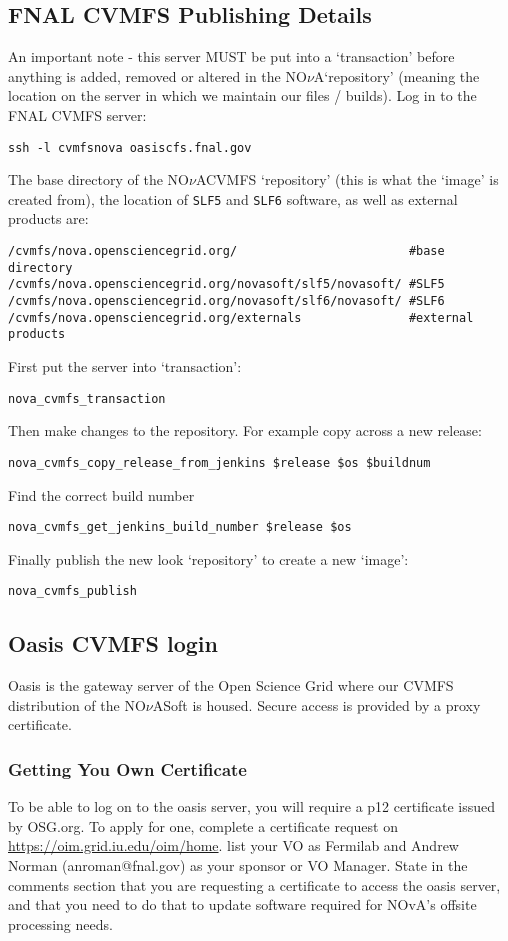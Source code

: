 \documentclass[letterpaper,10pt]{article}
\newcommand{\nova}{NO$\nu$A}
\newcommand{\novas}{\nova \space}
\begin{document}
\subsection{FNAL CVMFS Publishing Details}
An important note - this server MUST be put into a `transaction' before anything is added, removed or altered in the \novas `repository' (meaning the location on the server in which we maintain our files / builds).
\noindent
Log in to the FNAL CVMFS server:

\begin{verbatim}
ssh -l cvmfsnova oasiscfs.fnal.gov
\end{verbatim}
\noindent
The base directory of the \novas CVMFS `repository' (this is what the `image' is created from), the location of \verb|SLF5| and \verb|SLF6| software, as well as external products are:

\begin{verbatim}
/cvmfs/nova.opensciencegrid.org/                        #base directory 
/cvmfs/nova.opensciencegrid.org/novasoft/slf5/novasoft/ #SLF5
/cvmfs/nova.opensciencegrid.org/novasoft/slf6/novasoft/ #SLF6
/cvmfs/nova.opensciencegrid.org/externals               #external products
\end{verbatim}
\noindent
First put the server into `transaction':
\begin{verbatim}
nova_cvmfs_transaction
\end{verbatim}
\noindent
Then make changes to the repository. For example copy across a new release:
\begin{verbatim}
nova_cvmfs_copy_release_from_jenkins $release $os $buildnum
\end{verbatim}
\noindent
Find the correct build number
\begin{verbatim}
nova_cvmfs_get_jenkins_build_number $release $os
\end{verbatim}
\noindent
Finally publish the new look `repository' to create a new `image':
\begin{verbatim}
nova_cvmfs_publish
\end{verbatim}


\subsection{Oasis CVMFS login}
Oasis is the gateway server of the Open Science Grid where our CVMFS distribution of the \nova Soft is housed. Secure access is provided by a proxy certificate.

\subsubsection{Getting You Own Certificate}
To be able to log on to the oasis server, you will require a p12 certificate issued by OSG.org. To apply for one, complete a certificate request on \url{https://oim.grid.iu.edu/oim/home}. list your VO as Fermilab and Andrew Norman (anroman@fnal.gov) as your sponsor or VO Manager. State in the comments section that you are requesting a certificate to access the oasis server, and that you need to do that to update software required for NOvA's offsite processing needs.
\end{document}
